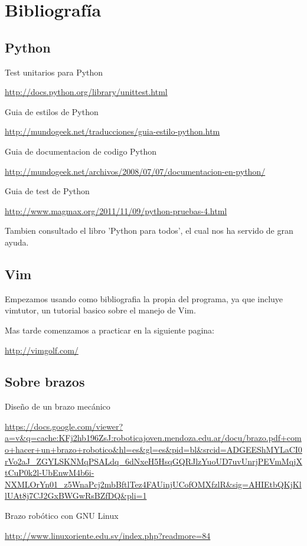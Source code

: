 \documentclass[12pt,a4paper]{report}
\begin{document}
\chapter{Bibliografía}


\section{Python }
Test unitarios para Python

\url{http://docs.python.org/library/unittest.html}

Guia de estilos de Python

\url{http://mundogeek.net/traducciones/guia-estilo-python.htm}

Guia de documentacion de codigo Python

\url{http://mundogeek.net/archivos/2008/07/07/documentacion-en-python/}

Guia de test de Python

\url{http://www.magmax.org/2011/11/09/python-pruebas-4.html}

Tambien consultado el libro 'Python para todos', el cual nos ha servido de gran ayuda.

\section{Vim}

Empezamos usando como bibliografia la propia del programa, ya que incluye vimtutor, un tutorial basico sobre el manejo de Vim.

Mas tarde comenzamos a practicar en la siguiente pagina:

\url{http://vimgolf.com/}

\section{Sobre brazos}

Diseño de un brazo mecánico

\url{https://docs.google.com/viewer?a=v&q=cache:KFj2hb196ZsJ:roboticajoven.mendoza.edu.ar/docu/brazo.pdf+como+hacer+un+brazo+robotico&hl=es&gl=es&pid=bl&srcid=ADGEEShMYLaCI0rVo2aJ_ZGYLSKNMqPSALdq_6dNxeH5HsqGQRJlzYuoUD7uvUnrjPEVmMqjXtCuP0k2l-UbEnwM4b6i-NXMLOrYn01_z5WnaPcj2mbBftlTez4FAUinjUCofOMXfzlR&sig=AHIEtbQKjKllUAt8j7CJ2GxBWGwRsBZfDQ&pli=1}

Brazo robótico con GNU  Linux

\url{http://www.linuxoriente.edu.sv/index.php?readmore=84}
\end{document}
